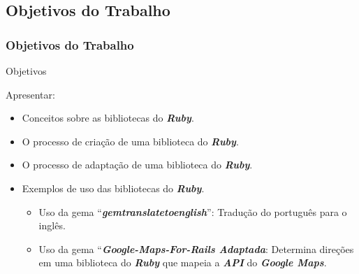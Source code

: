  \subsection{Objetivos do Trabalho}
 \begin{frame}
  \frametitle{Objetivos do Trabalho}

  \begin{block}{Objetivos}

   Apresentar:

   \begin{itemize}

    \item  Conceitos sobre as bibliotecas do \emph{\textbf{Ruby}}.

    \item  O processo de criação de uma biblioteca do \emph{\textbf{Ruby}}.

    \item  O processo de adaptação de uma biblioteca do \emph{\textbf{Ruby}}.

    \item  Exemplos de uso das bibliotecas do \emph{\textbf{Ruby}}.

    \begin{itemize}

     \item Uso da gema ``\emph{\textbf{gemtranslatetoenglish}}'': Tradução do português para o inglês.

     \item Uso da gema ``\emph{\textbf{Google-Maps-For-Rails Adaptada}}: Determina direções em uma
     biblioteca do \emph{\textbf{Ruby}} que mapeia a \emph{\textbf{API}} do
     \emph{\textbf{Google Maps}}.

    \end{itemize}

   \end{itemize}

  \end{block}

\end{frame}


